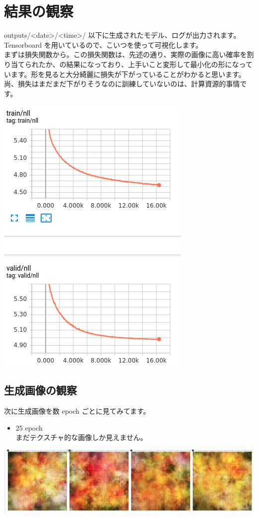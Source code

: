 \documentclass[dvipdfmx]{article}
\begin{document}
\section{結果の観察}
\label{sec:org84edff5}
outputs/<date>/<time>/ 以下に生成されたモデル、ログが出力されます。Tensorboard を用いているので、こいつを使って可視化します。\\
まずは損失関数から。この損失関数は、先述の通り、実際の画像に高い確率を割り当てられたか、の結果になっており、上手いこと変形して最小化の形になっています。形を見ると大分綺麗に損失が下がっていることがわかると思います。尚、損失はまだまだ下がりそうなのに訓練していないのは、計算資源的事情です。\\
\begin{center}
\includegraphics[width=0.5\linewidth]{./loss.png}
\end{center}

\subsection{生成画像の観察}
\label{sec:orgfbecd76}
次に生成画像を数 epoch ごとに見てみてます。\\

\begin{itemize}
\item 25 epoch\\
まだテクスチャ的な画像しか見えません。\\
\end{itemize}
\begin{center}
\includegraphics[width=0.75\linewidth]{./25epoch.png}
\end{center}
\end{document}
